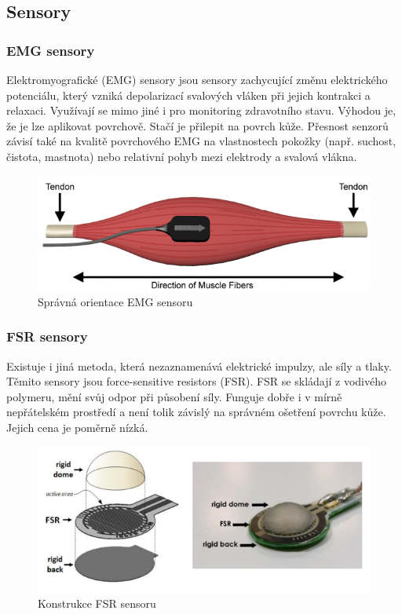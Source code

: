 \documentclass[a4paper,12pt]{article}
\begin{document}
\subsection{Sensory}
\subsubsection{EMG sensory}
Elektromyografické (EMG) sensory jsou sensory zachycující změnu elektrického potenciálu, který vzniká depolarizací svalových vláken při jejich kontrakci a relaxaci. Využívají se mimo jiné i pro monitoring zdravotního stavu. Výhodou je, že je lze aplikovat povrchově. Stačí je přilepit na povrch kůže. Přesnost senzorů závisí také na kvalitě povrchového EMG na vlastnostech pokožky (např. suchost, čistota, mastnota) nebo relativní pohyb mezi elektrody a svalová vlákna.\cite{Jung}\cite{EMGs}

\begin{figure}[hbtp]
\centering
\includegraphics[scale=0.6]{figures/emg-sensor-placement-1.png}
\caption{Správná orientace EMG sensoru \cite{EMGs}}
\end{figure}

\subsubsection{FSR sensory}
Existuje i jiná metoda, která nezaznamenává elektrické impulzy, ale síly a tlaky. Těmito sensory jsou force-sensitive resistors (FSR). FSR se skládají z vodivého polymeru, mění svůj odpor při působení síly. Funguje dobře i v mírně nepřátelském prostředí a není tolik závislý na správném ošetření povrchu kůže. Jejich cena je poměrně nízká.\cite{Jung}

\begin{figure}[hbtp]
\centering
\includegraphics[scale=0.9]{figures/FSR_sensor.PNG}
\caption{Konstrukce FSR sensoru \cite{Jung}}
\end{figure}\break
\end{document}
